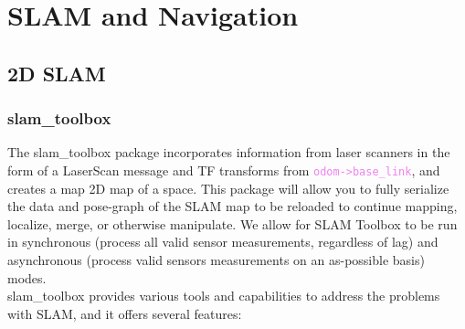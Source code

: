 \section{SLAM and Navigation}
\subsection{2D SLAM}
\subsubsection*{slam\_toolbox}
The slam\_toolbox package incorporates information from laser scanners in the form of a LaserScan message and TF transforms from \textcolor{Violet}{\texttt{odom->base\_link}}, and creates a map 2D map of a space. This package will allow you to fully serialize the data and pose-graph of the SLAM map to be reloaded to continue mapping, localize, merge, or otherwise manipulate. We allow for SLAM Toolbox to be run in synchronous (process all valid sensor measurements, regardless of lag) and asynchronous (process valid sensors measurements on an as-possible basis) modes.\\

slam\_toolbox provides various tools and capabilities to address the problems with SLAM, and it offers several features:

